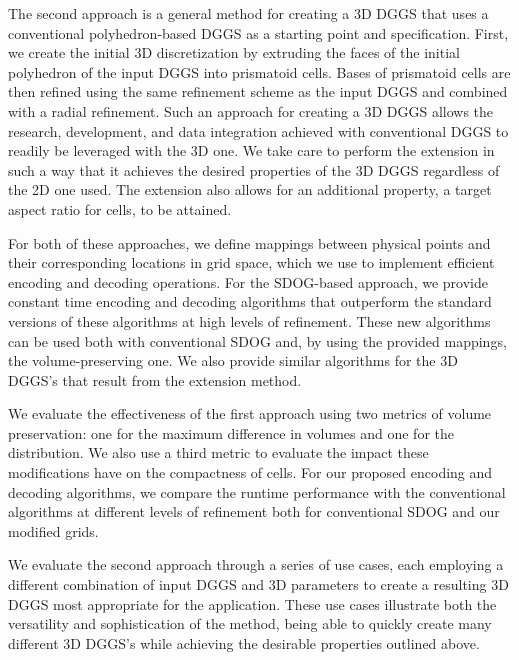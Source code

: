 The second approach is a general method for creating a 3D DGGS that uses a conventional polyhedron-based DGGS as a starting point and specification.
First, we create the initial 3D discretization by extruding the faces of the initial polyhedron of the input DGGS into prismatoid cells.
Bases of prismatoid cells are then refined using the same refinement scheme as the input DGGS and combined with a radial refinement.
Such an approach for creating a 3D DGGS allows the research, development, and data integration achieved with conventional DGGS to readily be leveraged with the 3D one.
We take care to perform the extension in such a way that it achieves the desired properties of the 3D DGGS regardless of the 2D one used.
The extension also allows for an additional property, a target aspect ratio for cells, to be attained.


For both of these approaches, we define mappings between physical points and their corresponding locations in grid space, which we use to implement efficient encoding and decoding operations.
For the SDOG-based approach, we provide constant time encoding and decoding algorithms that outperform the standard versions of these algorithms at high levels of refinement.
These new algorithms can be used both with conventional SDOG and, by using the provided mappings, the volume-preserving one.
We also provide similar algorithms for the 3D DGGS's that result from the extension method.


We evaluate the effectiveness of the first approach using two metrics of volume preservation: one for the maximum difference in volumes and one for the distribution.
We also use a third metric to evaluate the impact these modifications have on the compactness of cells.
For our proposed encoding and decoding algorithms, we compare the runtime performance with the conventional algorithms at different levels of refinement both for conventional SDOG and our modified grids.


We evaluate the second approach through a series of use cases, each employing a different combination of input DGGS and 3D parameters to create a resulting 3D DGGS most appropriate for the application.
These use cases illustrate both the versatility and sophistication of the method, being able to quickly create many different 3D DGGS's while achieving the desirable properties outlined above.


